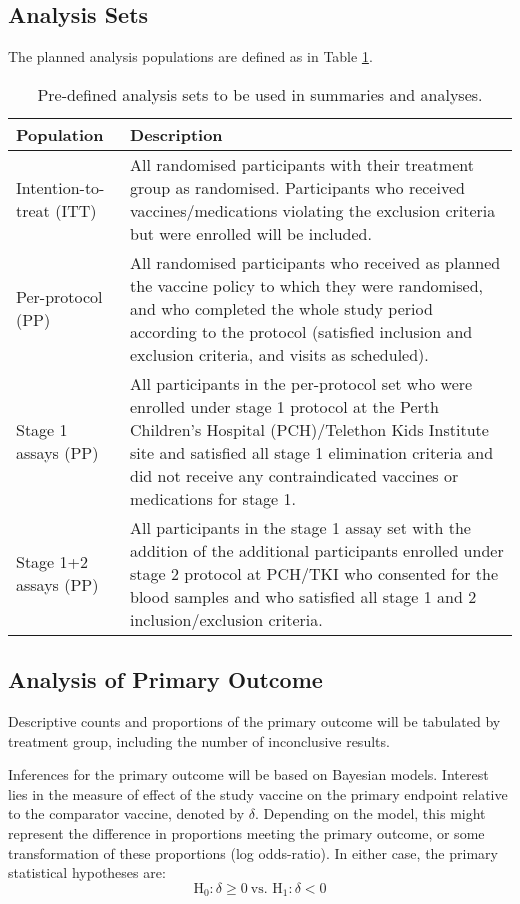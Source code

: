 \documentclass{bmcart}
\begin{document}
\subsection*{Analysis Sets}

The planned analysis populations are defined as in Table \ref{tab:analysis-sets}.

\renewcommand{\arraystretch}{2}
\begin{table}[!ht]
	\caption{Pre-defined analysis sets to be used in summaries and analyses.}
	\label{tab:analysis-sets}
	\begin{tabular}{lp{8cm}}
		Population & Description \\ \hline
		Intention-to-treat (ITT) & All randomised participants with their treatment group as randomised. Participants who received vaccines/medications violating the exclusion criteria but were enrolled will be included. \\
		Per-protocol (PP) & All randomised participants who received as planned the vaccine policy to which they were randomised, and who completed the whole study period according to the protocol (satisfied inclusion and exclusion criteria, and visits as scheduled).
		\\
		Stage 1 assays (PP) & All participants in the per-protocol set who were enrolled under stage 1 protocol at the Perth Children's Hospital (PCH)/Telethon Kids Institute site and satisfied all stage 1 elimination criteria and did not receive any contraindicated vaccines or medications for stage 1.\\
		Stage 1+2 assays (PP) & All participants in the stage 1 assay set with the addition of the additional participants enrolled under stage 2 protocol at PCH/TKI who consented for the blood samples and who satisfied all stage 1 and 2 inclusion/exclusion criteria. \\
		\hline
	\end{tabular}
\end{table}
\renewcommand{\arraystretch}{1.25}

\subsection*{Analysis of Primary Outcome}

Descriptive counts and proportions of the primary outcome will be tabulated by treatment group, including the number of inconclusive results.

Inferences for the primary outcome will be based on Bayesian models. Interest lies in the measure of effect of the study vaccine on the primary endpoint relative to the comparator vaccine, denoted by \(\delta\).
Depending on the model, this might represent the difference in proportions meeting the primary outcome, or some transformation of these proportions (log odds-ratio).
In either case, the primary statistical hypotheses are:
$$
\textrm{H}_0:\delta\geq 0\ \text{vs. } \mathrm{H}_1:\delta <0
$$
\end{document}
